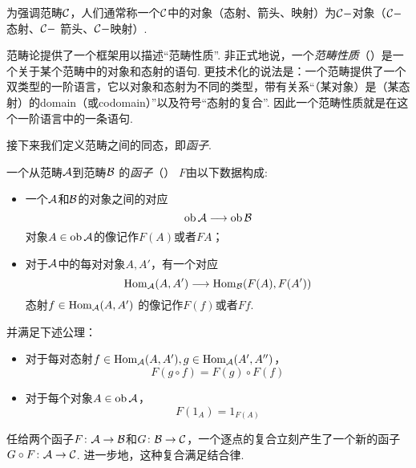   \begin{rem}
     为强调范畴${\cal C}$，人们通常称一个${\cal C}$中的对象（态射、箭头、映射）为${\cal C}-$对象（${\cal C}-$态射、${\cal C}-$ 箭头、${\cal C}-$映射）.
  \end{rem}
\begin{rem}
  范畴论提供了一个框架用以描述“范畴性质”. 非正式地说，一个\emph{范畴性质}（）是一个关于某个范畴中的对象和态射的语句. 更技术化的说法是：一个范畴提供了一个双类型的一阶语言，它以对象和态射为不同的类型，带有关系“（某对象）是（某态射）的domain（或codomain）”以及符号“态射的复合”. 因此一个范畴性质就是在这个一阶语言中的一条语句.
\end{rem}

  接下来我们定义范畴之间的同态，即\emph{函子}.
  \begin{defn}
    一个从范畴${\cal A}$到范畴${\cal B}$ 的\emph{函子}（） $ F$由以下数据构成:
    \begin{itemize}
      \item 一个${\cal A}$和${\cal B}$的对象之间的对应
                 \begin{equation*}
                   \operatorname{ob}{\cal A}\longrightarrow\operatorname{ob}{\cal B}
                 \end{equation*}
                 对象$A\in\operatorname{ob}{\cal A}$的像记作$ F(A)$或者$ F A$；
      \item 对于${\cal A}$中的每对对象$A, A'$，有一个对应
                 \begin{equation*}
                   \operatorname{Hom}_{{\cal A}}(A,A')\longrightarrow\operatorname{Hom}_{{\cal B}}( F(A), F(A'))
                 \end{equation*}
                 态射$f\in\operatorname{Hom}_{{\cal A}}(A,A')$ 的像记作$ F(f)$或者$ F f$.
    \end{itemize}
    并满足下述公理：
    \begin{itemize}
      \item 对于每对态射$f\in\operatorname{Hom}_{{\cal A}}(A,A'), g\in\operatorname{Hom}_{{\cal A}}(A',A'')$，
                 \begin{equation*}
                    F(g\circ f) =  F(g)\circ F(f)
                 \end{equation*}
      \item 对于每个对象$A\in\operatorname{ob}{\cal A}$，
                 \begin{equation*}
                    F(1_A) = 1_{F(A)}
                 \end{equation*}
    \end{itemize}
  \end{defn}

  任给两个函子$ F\colon{\cal A}\to{\cal B}$和$ G\colon{\cal B}\to{\cal C}$，一个逐点的复合立刻产生了一个新的函子$ G\circ F\colon{\cal A}\to{\cal C}$. 进一步地，这种复合满足结合律.

